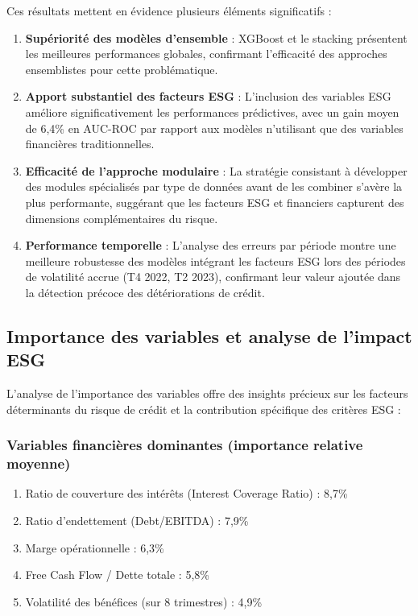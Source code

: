 Ces résultats mettent en évidence plusieurs éléments significatifs :

\begin{enumerate}
  \item \textbf{Supériorité des modèles d'ensemble} : XGBoost et le stacking présentent les meilleures performances globales, confirmant l'efficacité des approches ensemblistes pour cette problématique.

  \item \textbf{Apport substantiel des facteurs ESG} : L'inclusion des variables ESG améliore significativement les performances prédictives, avec un gain moyen de 6,4\% en AUC-ROC par rapport aux modèles n'utilisant que des variables financières traditionnelles.

  \item \textbf{Efficacité de l'approche modulaire} : La stratégie consistant à développer des modules spécialisés par type de données avant de les combiner s'avère la plus performante, suggérant que les facteurs ESG et financiers capturent des dimensions complémentaires du risque.

  \item \textbf{Performance temporelle} : L'analyse des erreurs par période montre une meilleure robustesse des modèles intégrant les facteurs ESG lors des périodes de volatilité accrue (T4 2022, T2 2023), confirmant leur valeur ajoutée dans la détection précoce des détériorations de crédit.
\end{enumerate}

\subsection{Importance des variables et analyse de l'impact ESG}

L'analyse de l'importance des variables offre des insights précieux sur les facteurs déterminants du risque de crédit et la contribution spécifique des critères ESG :

\subsubsection{Variables financières dominantes (importance relative moyenne)}
\begin{enumerate}
  \item Ratio de couverture des intérêts (Interest Coverage Ratio) : 8,7\%
  \item Ratio d'endettement (Debt/EBITDA) : 7,9\%
  \item Marge opérationnelle : 6,3\%
  \item Free Cash Flow / Dette totale : 5,8\%
  \item Volatilité des bénéfices (sur 8 trimestres) : 4,9\%
\end{enumerate}

